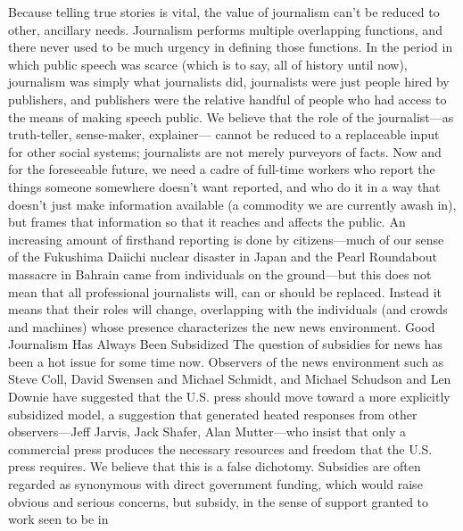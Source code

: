 Because telling true stories is vital, the value of journalism can’t be reduced to
other, ancillary needs. Journalism performs multiple overlapping functions, and
there never used to be much urgency in defining those functions. In the period
in which public speech was scarce (which is to say, all of history until now),
journalism was simply what journalists did, journalists were just people hired by
publishers, and publishers were the relative handful of people who had access to
the means of making speech public.
We believe that the role of the journalist—as truth-teller, sense-maker, explainer—
cannot be reduced to a replaceable input for other social systems; journalists are
not merely purveyors of facts. Now and for the foreseeable future, we need a
cadre of full-time workers who report the things someone somewhere doesn’t
want reported, and who do it in a way that doesn’t just make information available
(a commodity we are currently awash in), but frames that information so
that it reaches and affects the public.
An increasing amount of firsthand reporting is done by citizens—much of our
sense of the Fukushima Daiichi nuclear disaster in Japan and the Pearl Roundabout
massacre in Bahrain came from individuals on the ground—but this does
not mean that all professional journalists will, can or should be replaced. Instead it
means that their roles will change, overlapping with the individuals (and crowds
and machines) whose presence characterizes the new news environment.
Good Journalism Has Always Been Subsidized
The question of subsidies for news has been a hot issue for some time now.
Observers of the news environment such as Steve Coll, David Swensen and
Michael Schmidt, and Michael Schudson and Len Downie have suggested that
the U.S. press should move toward a more explicitly subsidized model, a suggestion
that generated heated responses from other observers—Jeff Jarvis, Jack Shafer,
Alan Mutter—who insist that only a commercial press produces the necessary
resources and freedom that the U.S. press requires.
We believe that this is a false dichotomy. Subsidies are often regarded as synonymous
with direct government funding, which would raise obvious and serious
concerns, but subsidy, in the sense of support granted to work seen to be in

